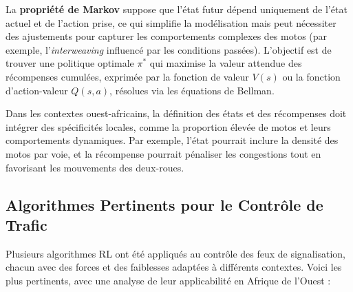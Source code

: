La \textbf{propriété de Markov} suppose que l'état futur dépend uniquement de l'état actuel et de l'action prise, ce qui simplifie la modélisation mais peut nécessiter des ajustements pour capturer les comportements complexes des motos (par exemple, l'\textit{interweaving} influencé par les conditions passées). L'objectif est de trouver une politique optimale $\pi^*$ qui maximise la valeur attendue des récompenses cumulées, exprimée par la fonction de valeur $V(s)$ ou la fonction d'action-valeur $Q(s, a)$, résolues via les équations de Bellman.

Dans les contextes ouest-africains, la définition des états et des récompenses doit intégrer des spécificités locales, comme la proportion élevée de motos et leurs comportements dynamiques. Par exemple, l'état pourrait inclure la densité des motos par voie, et la récompense pourrait pénaliser les congestions tout en favorisant les mouvements des deux-roues.


\subsection{Algorithmes Pertinents pour le Contrôle de Trafic}
\label{subsec:rl_algos}

Plusieurs algorithmes RL ont été appliqués au contrôle des feux de signalisation, chacun avec des forces et des faiblesses adaptées à différents contextes. Voici les plus pertinents, avec une analyse de leur applicabilité en Afrique de l'Ouest :


